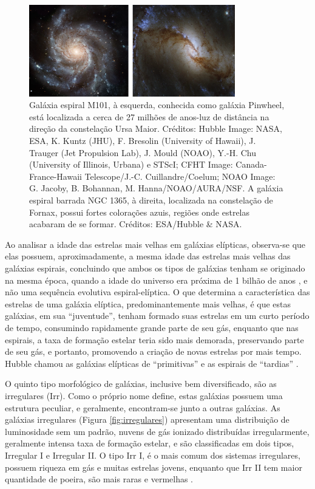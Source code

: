 \begin{figure}[h] 
  \centering 
  \includegraphics[width=0.8\textwidth]{Imagens/espirais.png} 
  \caption[Galáxia espiral M101 e espiral barrada NGC 1365.]{Galáxia espiral M101, à esquerda, conhecida como galáxia Pinwheel, está localizada a cerca de 27 milhões de anos-luz de distância na direção da constelação Ursa Maior. Créditos: Hubble Image: NASA, ESA, K. Kuntz (JHU), F. Bresolin (University of Hawaii), J. Trauger (Jet Propulsion Lab), J. Mould (NOAO), Y.-H. Chu (University of Illinois, Urbana) e STScI; CFHT Image: Canada-France-Hawaii Telescope/J.-C. Cuillandre/Coelum; NOAO Image: G. Jacoby, B. Bohannan, M. Hanna/NOAO/AURA/NSF. A galáxia espiral barrada NGC 1365, à direita, localizada na constelação de Fornax, possui fortes colorações azuis, regiões onde estrelas acabaram de se formar. Créditos: ESA/Hubble \& NASA.}
  \label{fig:espirais} 
\end{figure}

Ao analisar a idade das estrelas mais velhas em galáxias elípticas, observa-se que elas possuem, aproximadamente, a mesma idade das estrelas mais velhas das galáxias espirais, concluindo que ambos os tipos de galáxias tenham se originado na mesma época, quando a idade do universo era próxima de 1 bilhão de anos \cite{2023Muller}, e não uma sequência evolutiva espiral-elíptica. O que determina a característica das estrelas de uma galáxia elíptica, predominantemente mais velhas, é que estas galáxias, em sua ``juventude'', tenham formado suas estrelas em um curto período de tempo, consumindo rapidamente grande parte de seu gás, enquanto que nas espirais, a taxa de formação estelar teria sido mais demorada, preservando parte de seu gás, e portanto, promovendo a criação de novas estrelas por mais tempo. Hubble chamou as galáxias elípticas de ``primitivas'' e as espirais de ``tardias'' \cite{2022gastao, 2010arnab}.

O quinto tipo morfológico de galáxias, inclusive bem diversificado, são as irregulares (Irr). Como o próprio nome define, estas galáxias possuem uma estrutura peculiar, e geralmente, encontram-se junto a outras galáxias. As galáxias irregulares (Figura \ref{fig:irregulares}) apresentam uma distribuição de luminosidade sem um padrão, nuvens de gás ionizado distribuídas irregularmente, geralmente intensa taxa de formação estelar, e são classificadas em dois tipos, Irregular I e Irregular II. O tipo Irr I, é o mais comum dos sistemas irregulares, possuem riqueza em gás e muitas estrelas jovens, enquanto que Irr II tem maior quantidade de poeira, são mais raras e vermelhas \cite{2009soares, 2022gastao}.

